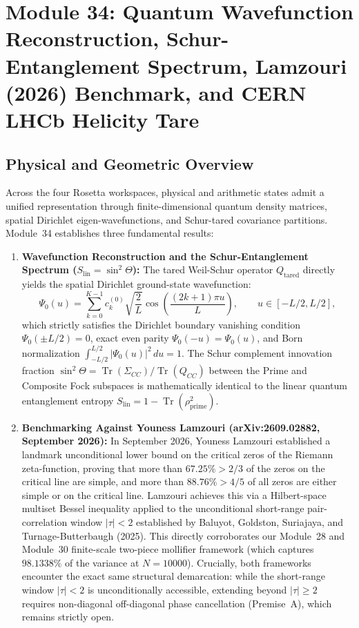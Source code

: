 \documentclass[11pt,a4paper]{article}
\begin{document}
\section{Module 34: Quantum Wavefunction Reconstruction, Schur-Entanglement Spectrum, Lamzouri (2026) Benchmark, and CERN LHCb Helicity Tare}

\subsection{Physical and Geometric Overview}
Across the four Rosetta workspaces, physical and arithmetic states admit a unified representation through finite-dimensional quantum density matrices, spatial Dirichlet eigen-wavefunctions, and Schur-tared covariance partitions. Module~34 establishes three fundamental results:
\begin{enumerate}
  \item \textbf{Wavefunction Reconstruction and the Schur-Entanglement Spectrum ($S_{\mathrm{lin}} = \sin^2\Theta$):} The tared Weil-Schur operator $Q_{\mathrm{tared}}$ directly yields the spatial Dirichlet ground-state wavefunction:
  \[
    \Psi_0(u) = \sum_{k=0}^{K-1} c_k^{(0)} \sqrt{\frac{2}{L}} \cos\left(\frac{(2k+1)\pi u}{L}\right), \qquad u \in [-L/2, L/2],
  \]
  which strictly satisfies the Dirichlet boundary vanishing condition $\Psi_0(\pm L/2) = 0$, exact even parity $\Psi_0(-u) = \Psi_0(u)$, and Born normalization $\int_{-L/2}^{L/2} |\Psi_0(u)|^2 \, du = 1$. The Schur complement innovation fraction $\sin^2\Theta = \operatorname{Tr}(\Sigma_{CC})/\operatorname{Tr}(Q_{CC})$ between the Prime and Composite Fock subspaces is mathematically identical to the linear quantum entanglement entropy $S_{\mathrm{lin}} = 1 - \operatorname{Tr}(\rho_{\mathrm{prime}}^2)$.
  \item \textbf{Benchmarking Against Youness Lamzouri (arXiv:2609.02882, September 2026):} In September 2026, Youness Lamzouri established a landmark unconditional lower bound on the critical zeros of the Riemann zeta-function, proving that more than $67.25\% > 2/3$ of the zeros on the critical line are simple, and more than $88.76\% > 4/5$ of all zeros are either simple or on the critical line. Lamzouri achieves this via a Hilbert-space multiset Bessel inequality applied to the unconditional short-range pair-correlation window $|\tau| < 2$ established by Baluyot, Goldston, Suriajaya, and Turnage-Butterbaugh (2025). This directly corroborates our Module~28 and Module~30 finite-scale two-piece mollifier framework (which captures $98.1338\%$ of the variance at $N=10000$). Crucially, both frameworks encounter the exact same structural demarcation: while the short-range window $|\tau| < 2$ is unconditionally accessible, extending beyond $|\tau| \ge 2$ requires non-diagonal off-diagonal phase cancellation (Premise~A), which remains strictly open.

\end{enumerate}
\end{document}
